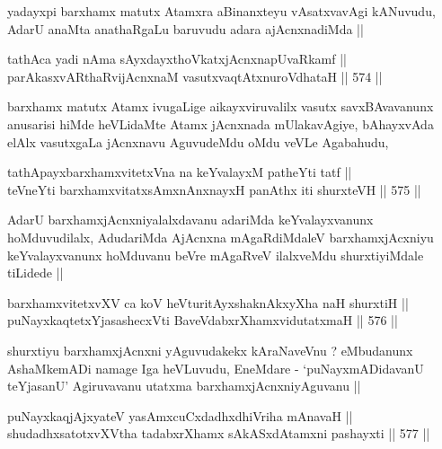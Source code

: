 \begin{artha}
yadayxpi barxhamx matutx Atamxra aBinanxteyu vAsatxvavAgi kANuvudu,
AdarU anaMta anathaRgaLu baruvudu adara ajAcnxnadiMda ||
\end{artha}

\begin{shl}
tathAca yadi nAma sAyxdayxthoVkatxjAcnxnapUvaRkamf || \\
parAkasxvARthaRvijAcnxnaM vasutxvaqtAtxnuroVdhataH ||  574 ||  
\end{shl}

\begin{artha}
barxhamx matutx Atamx ivugaLige aikayxviruvalilx vasutx savxBAvavanunx
anusarisi hiMde heVLidaMte Atamx jAcnxnada mUlakavAgiye, bAhayxvAda
elAlx vasutxgaLa jAcnxnavu AguvudeMdu oMdu veVLe Agabahudu, 
\end{artha}

\begin{shl}
tathA\s payxbarxhamxvitetxVna na keYvalayxM patheYti tatf || \\
teVneYti barxhamxvitatxsAmxnAnxnayxH panAthx iti shurxteVH ||  575 ||  
\end{shl}

\begin{artha}
AdarU barxhamxjAcnxniyalalxdavanu adariMda keYvalayxvanunx
hoMduvudilalx, AdudariMda AjAcnxna mAgaRdiMdaleV barxhamxjAcxniyu
keYvalayxvanunx hoMduvanu beVre mAgaRveV ilalxveMdu shurxtiyiMdale
tiLidede ||
\end{artha}


\begin{shl}
barxhamxvitetxvXV ca koV heVturitAyxshaknAkxyX\s \s ha naH shurxtiH || \\
puNayxkaqtetxYjasashecxVti BaveVdabxrXhamxvidutatxmaH ||  576 ||  
\end{shl}

\begin{artha}
shurxtiyu barxhamxjAcnxni yAguvudakekx kAraNaveVnu ? eMbudanunx
AshaMkemADi namage Iga heVLuvudu, EneMdare  - `puNayxmADidavanU
teYjasanU' Agiruvavanu utatxma barxhamxjAcnxniyAguvanu ||
\end{artha}


\begin{shl}
puNayxkaqjAjxyateV yasAmxcuCxdadhxdhiVriha mAnavaH || \\
shudadhxsatotxvXV\s tha tadabxrXhamx sAkASxdAtamxni pashayxti ||  577 ||  
\end{shl}

